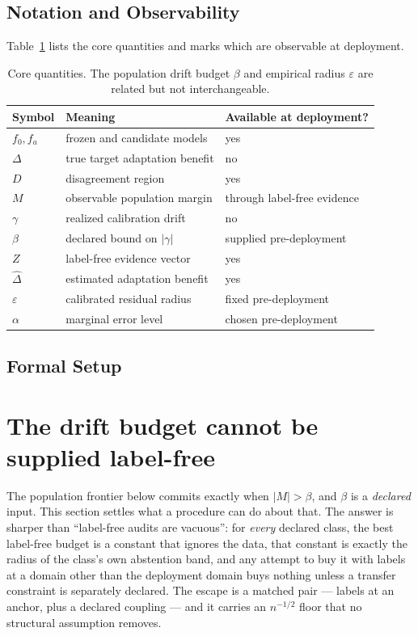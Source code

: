 \subsection{Notation and Observability}
Table~\ref{tab:notation-main} lists the core quantities and marks which are observable at deployment.
\begin{table}[t]\centering\scriptsize
\caption{Core quantities. The population drift budget $\beta$ and empirical radius $\varepsilon$ are related but not interchangeable.}
\label{tab:notation-main}
\begin{tabular}{@{}lll@{}}
\toprule
Symbol & Meaning & Available at deployment? \\
\midrule
$f_0,f_a$ & frozen and candidate models & yes \\
$\Delta$ & true target adaptation benefit & no \\
$D$ & disagreement region & yes \\
$M$ & observable population margin & through label-free evidence \\
$\gamma$ & realized calibration drift & no \\
$\beta$ & declared bound on $|\gamma|$ & supplied pre-deployment \\
$Z$ & label-free evidence vector & yes \\
$\widehat\Delta$ & estimated adaptation benefit & yes \\
$\varepsilon$ & calibrated residual radius & fixed pre-deployment \\
$\alpha$ & marginal error level & chosen pre-deployment \\
\bottomrule
\end{tabular}
\end{table}


\subsection{Formal Setup}


\section{The drift budget cannot be supplied label-free}\label{sec:impossible}\label{sec:theory}
The population frontier below commits exactly when $|M|>\beta$, and $\beta$ is a \emph{declared}
input. This section settles what a procedure can do about that. The answer is sharper than
``label-free audits are vacuous'': for \emph{every} declared class, the best label-free budget is a
constant that ignores the data, that constant is exactly the radius of the class's own abstention
band, and any attempt to buy it with labels at a domain other than the deployment domain buys
nothing unless a transfer constraint is separately declared. The escape is a matched pair --- labels
at an anchor, plus a declared coupling --- and it carries an $n^{-1/2}$ floor that no structural
assumption removes.


